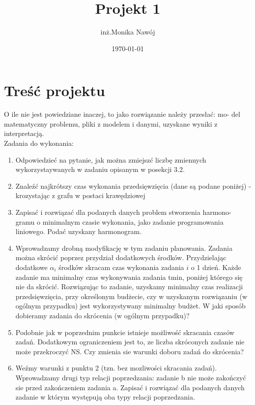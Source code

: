 \documentclass[
    12pt, %
]{../fphw}
\title{Projekt 1} %
\author{inż.Monika Nawój} %
\date{\today} %
\institute{Politechnika Warszawska \\ Wydział Elektroniki i Technik Informacyjnych} %
\begin{document}
\maketitle %


\section{Treść projektu}
O ile nie jest powiedziane inaczej, to jako rozwiązanie należy przesłać: mo-
del matematyczny problemu, pliki z modelem i danymi, uzyskane wyniki z
interpretacją. \\
Zadania do wykonania:
\begin{enumerate}
    \item Odpowiedzieć na pytanie, jak można zmiejszć liczbę zmiennych wykorzystaywanych w zadaniu opisanym w posekcji 3.2.
    \item Znaleźć najkrótszy czas wykonania przedsięwzięcia (dane są podane poniżej) - krozystając z grafu w postaci krawędziowej
    \item Zapisać i rozwiązać dla podanych danych problem stworzenia harmono-
          gramu o minimalnym czasie wykonania, jako zadanie programowania
          liniowego. Podać uzyskany harmonogram.
    \item Wprowadzamy drobną modyfikację w tym zadaniu planowania. Zadania można skrócić poprzez przydział dodatkowych środków.
          Przydzielając dodatkowe \(\alpha_i\) środków skracam czas wykonania zadania \(i\) o 1
          dzień. Każde zadanie ma minimalny czas wykonywania zadania tmin,
          poniżej którego się nie da skrócić. Rozwiązując to zadanie, uzyskamy
          minimalny czas realizacji przedsięwzięcia, przy określonym budżecie,
          czy w uzyskanym rozwiązaniu (w ogólnym przypadku) jest wykorzystywany minimalny budżet. W jaki sposób dobieramy zadania do skrócenia (w ogólnym przypadku)?
    \item Podobnie jak w poprzednim punkcie istnieje możliwość skracania czasów zadań. Dodatkowym ograniczeniem jest to, ze liczba skróconych
          zadanie nie może przekroczyć NS. Czy zmienia sie warunki doboru
          zadań do skrócenia?
    \item Weźmy warunki z punktu 2 (tzn. bez mozliwości skracania zadań).
          Wprowadzamy drugi typ relacji poprzedzania: zadanie b nie może zakończyć sie przed zakończeniem zadania a. Zapisać i rozwiązać dla
          podanych danych zadanie w którym występują oba typy relacji poprzedzania.
\end{enumerate}
\end{document}
